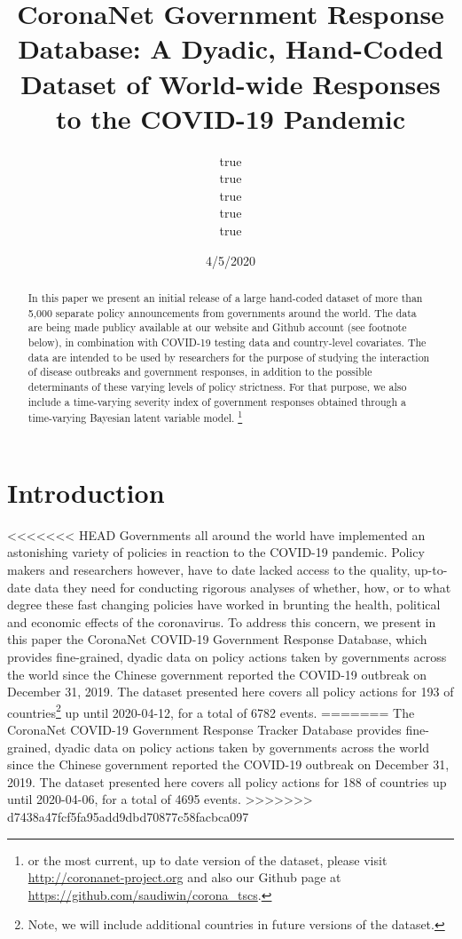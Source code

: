 \documentclass[]{article}
\title{CoronaNet Government Response Database: A Dyadic, Hand-Coded Dataset of World-wide Responses to the COVID-19 Pandemic}
\author{true \\ true \\ true \\ true \\ true}
\date{4/5/2020}
\let\rmarkdownfootnote\footnote%
\def\footnote{\protect\rmarkdownfootnote}
\begin{document}
\maketitle
\begin{abstract}
In this paper we present an initial release of a large hand-coded dataset of more than 5,000 separate policy announcements from governments around the world. The data are being made publicy available at our website and Github account (see footnote below), in combination with COVID-19 testing data and country-level covariates. The data are intended to be used by researchers for the purpose of studying the interaction of disease outbreaks and government responses, in addition to the possible determinants of these varying levels of policy strictness. For that purpose, we also include a time-varying severity index of government responses obtained through a time-varying Bayesian latent variable model. \footnote{or the most current, up to date version of the dataset, please visit \url{http://coronanet-project.org} and also our Github page at \url{https://github.com/saudiwin/corona_tscs}.}
\end{abstract}

\hypertarget{introduction}{%
\section{Introduction}\label{introduction}}

<<<<<<< HEAD
Governments all around the world have implemented an astonishing variety of policies in reaction to the COVID-19 pandemic. Policy makers and researchers however, have to date lacked access to the quality, up-to-date data they need for conducting rigorous analyses of whether, how, or to what degree these fast changing policies have worked in brunting the health, political and economic effects of the coronavirus. To address this concern, we present in this paper the CoronaNet COVID-19 Government Response Database, which provides fine-grained, dyadic data on policy actions taken by governments across the world since the Chinese government reported the COVID-19 outbreak on December 31, 2019. The dataset presented here covers all policy actions for 193 of countries\footnote{Note, we will include additional countries in future versions of the dataset.} up until 2020-04-12, for a total of 6782 events.
=======
The CoronaNet COVID-19 Government Response Tracker Database provides fine-grained, dyadic data on policy actions taken by governments across the world since the Chinese government reported the COVID-19 outbreak on December 31, 2019. The dataset presented here covers all policy actions for 188 of countries up until 2020-04-06, for a total of 4695 events.
>>>>>>> d7438a47fcf5fa95add9dbd70877c58facbca097
\end{document}
